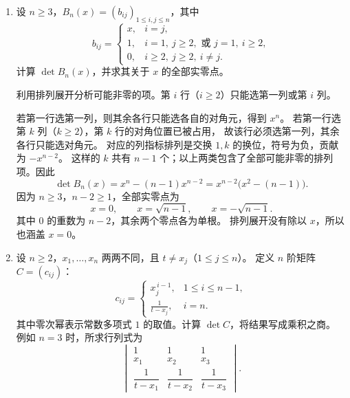\documentclass[UTF8,12pt,a4paper,fontset=fandol]{ctexart}
\begin{document}
\begin{enumerate}[label=\arabic*.]
\begin{solve}
按 $i=n,n-1,\ldots,2$ 的顺序，依次作 $R_i\leftarrow R_i-R_{i-1}$。
必须从下往上进行，使每次减去的第 $i-1$ 行仍为原矩阵中的行。
对 $i\geq2$，变换后的第 $(i,j)$ 个元素为
\[
a^{\min(i,j)}-a^{\min(i-1,j)}
=\begin{cases}
0,&j<i,\\
a^i-a^{i-1},&j\geq i.
\end{cases}
\]
因此变换后为上三角矩阵，主对角线依次为
$a,a^2-a,\ldots,a^n-a^{n-1}$。于是
\begin{align*}
D_n(a)&=a\prod_{i=2}^n(a^i-a^{i-1})\\
&=a\prod_{i=2}^n\bigl(a^{i-1}(a-1)\bigr)\\
&=\boxed{a^{\,1+n(n-1)/2}(a-1)^{n-1}}.
\end{align*}
全程只有倍加变换和多项式因式分解，没有除以 $a$ 或 $a-1$。
当 $a=0$ 时原矩阵为零矩阵；当 $a=1$ 时原矩阵全为 $1$，且 $n\geq2$，行列式为零。
这两种情形都与公式一致。
\end{solve}

\item\label{q:detcalc-arrow}
设 $n\geq3$，$B_n(x)=(b_{ij})_{1\leq i,j\leq n}$，其中
\[
b_{ij}=\begin{cases}
x,&i=j,\\
1,&i=1,\ j\geq2,\text{ 或 }j=1,\ i\geq2,\\
0,&i\geq2,\ j\geq2,\ i\ne j.
\end{cases}
\]
计算 $\det B_n(x)$，并求其关于 $x$ 的全部实零点。

\begin{solve}
利用排列展开分析可能非零的项。第 $i$ 行（$i\geq2$）只能选第一列或第 $i$ 列。

若第一行选第一列，则其余各行只能选各自的对角元，得到 $x^n$。
若第一行选第 $k$ 列（$k\geq2$），第 $k$ 行的对角位置已被占用，
故该行必须选第一列，其余各行只能选对角元。
对应的列指标排列是交换 $1,k$ 的换位，符号为负，贡献为 $-x^{n-2}$。
这样的 $k$ 共有 $n-1$ 个；以上两类包含了全部可能非零的排列项。因此
\[
\det B_n(x)=x^n-(n-1)x^{n-2}
=\boxed{x^{n-2}\bigl(x^2-(n-1)\bigr)}.
\]
因为 $n\geq3$，$n-2\geq1$，全部实零点为
\[
\boxed{x=0,\qquad x=\sqrt{n-1},\qquad x=-\sqrt{n-1}.}
\]
其中 $0$ 的重数为 $n-2$，其余两个零点各为单根。
排列展开没有除以 $x$，所以也涵盖 $x=0$。
\end{solve}

\item\label{q:detcalc-rational-vandermonde}
设 $n\geq2$，$x_1,\ldots,x_n$ 两两不同，且 $t\ne x_j$（$1\leq j\leq n$）。
定义 $n$ 阶矩阵 $C=(c_{ij})$：
\[
c_{ij}=\begin{cases}
x_j^{\,i-1},&1\leq i\leq n-1,\\
\displaystyle\frac{1}{t-x_j},&i=n.
\end{cases}
\]
其中零次幂表示常数多项式 $1$ 的取值。计算 $\det C$，将结果写成乘积之商。
例如 $n=3$ 时，所求行列式为
\[
\begin{vmatrix}
1&1&1\\
x_1&x_2&x_3\\
\dfrac{1}{t-x_1}&\dfrac{1}{t-x_2}&\dfrac{1}{t-x_3}
\end{vmatrix}.
\]


\end{enumerate}
\end{document}
